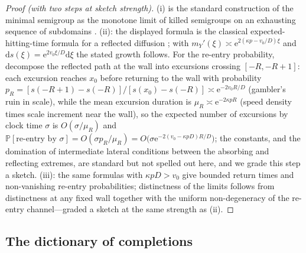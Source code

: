 \documentclass[11pt]{article}
\theoremstyle{definition}
\theoremstyle{remark}
\newcommand{\ee}{\mathrm{e}}
\newcommand{\dd}{\mathrm{d}}
\begin{document}
\begin{proof}[Proof (with two steps at sketch strength)]
(i) is the standard construction of the minimal semigroup as the
monotone limit of killed semigroups on an exhausting sequence of
subdomains \cite{ItoMcKean,Davies1980}. (ii): the displayed formula
is the classical expected-hitting-time formula for a reflected
diffusion \cite[Ch.~15]{KarlinTaylor}; with
$m_{Y}'(\xi)\asymp\ee^{2(\kappa p-v_{0}/D)\xi}$ and
$\dd s(\xi)=\ee^{2v_{0}\xi/D}\dd\xi$ the stated growth follows. For
the re-entry probability, decompose the reflected path at the wall
into excursions crossing $[-R,-R+1]$: each excursion reaches $x_{0}$
before returning to the wall with probability
$p_{R}=[s(-R+1)-s(-R)]/[s(x_{0})-s(-R)]\asymp\ee^{-2v_{0}R/D}$
(gambler's ruin in scale), while the mean excursion duration is
$\mu_{R}\asymp\ee^{-2\kappa pR}$ (speed density times scale increment
near the wall), so
the expected number of excursions by clock time $\sigma$ is
$O(\sigma/\mu_{R})$ and
$\mathbb{P}[\text{re-entry by }\sigma]
=O(\sigma p_{R}/\mu_{R})
=O\!\bigl(\sigma\ee^{-2(v_{0}-\kappa pD)R/D}\bigr)$; the constants,
and the domination of intermediate lateral conditions between the
absorbing and reflecting extremes, are standard but not spelled out
here, and we grade this step a sketch. (iii): the same formulas with
$\kappa pD>v_{0}$ give bounded return times and non-vanishing
re-entry probabilities; distinctness of the limits follows from
distinctness at any fixed wall together with the uniform
non-degeneracy of the re-entry channel---graded a sketch at the same
strength as (ii).
\end{proof}

\subsection{The dictionary of completions}
\end{document}
